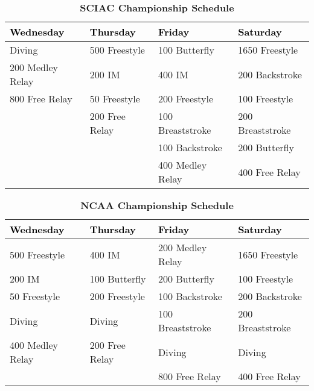 \begin{table}[H]
\centering
\caption*{\textbf{\textcolor{teamprimary}{SCIAC Championship Schedule}}}
\renewcommand{\arraystretch}{1.3}
\begin{tabular}{p{3.5cm} p{3.5cm} p{3.5cm} p{3.5cm}}
\toprule
\rowcolor{teamprimary!25}
\textbf{\textcolor{black}{Wednesday}} & \textbf{\textcolor{black}{Thursday}} & \textbf{\textcolor{black}{Friday}} & \textbf{\textcolor{black}{Saturday}} \\
\midrule
\rowcolor{teamsecondary!12}
Diving & 500 Freestyle & 100 Butterfly & 1650 Freestyle \\
\rowcolor{teamprimary!8}
200 Medley Relay & 200 IM & 400 IM & 200 Backstroke \\
\rowcolor{teamsecondary!12}
800 Free Relay & 50 Freestyle & 200 Freestyle & 100 Freestyle \\
\rowcolor{teamprimary!8}
 & 200 Free Relay & 100 Breaststroke & 200 Breaststroke \\
\rowcolor{teamsecondary!12}
 &  & 100 Backstroke & 200 Butterfly \\
\rowcolor{teamprimary!8}
 &  & 400 Medley Relay & 400 Free Relay \\
\bottomrule
\end{tabular}
\end{table}

\begin{table}[H]
\centering
\caption*{\textbf{\textcolor{teamprimary}{NCAA Championship Schedule}}}
\renewcommand{\arraystretch}{1.3}
\begin{tabular}{p{3.5cm} p{3.5cm} p{3.5cm} p{3.5cm}}
\toprule
\rowcolor{teamprimary!25}
\textbf{\textcolor{black}{Wednesday}} & \textbf{\textcolor{black}{Thursday}} & \textbf{\textcolor{black}{Friday}} & \textbf{\textcolor{black}{Saturday}} \\
\midrule
\rowcolor{teamsecondary!12}
500 Freestyle & 400 IM & 200 Medley Relay & 1650 Freestyle \\
\rowcolor{teamprimary!8}
200 IM & 100 Butterfly & 200 Butterfly & 100 Freestyle \\
\rowcolor{teamsecondary!12}
50 Freestyle & 200 Freestyle & 100 Backstroke & 200 Backstroke \\
\rowcolor{teamprimary!8}
Diving & Diving & 100 Breaststroke & 200 Breaststroke \\
\rowcolor{teamsecondary!12}
400 Medley Relay & 200 Free Relay & Diving & Diving \\
\rowcolor{teamprimary!8}
 &  & 800 Free Relay & 400 Free Relay \\
\bottomrule
\end{tabular}
\end{table}



